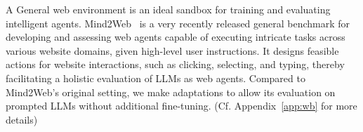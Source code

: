 A General web environment is an ideal sandbox for training and evaluating intelligent agents.
Mind2Web~\citep{deng2023mind2web} is a very recently released general benchmark for developing and assessing web agents capable of executing intricate tasks across various website domains, given high-level user instructions. 
It designs feasible actions for website interactions, such as clicking, selecting, and typing, thereby facilitating a holistic evaluation of LLMs as web agents.
Compared to Mind2Web's original setting, we make adaptations to allow its evaluation on prompted LLMs without additional fine-tuning.
(Cf. Appendix~\ref{app:wb} for more details)


